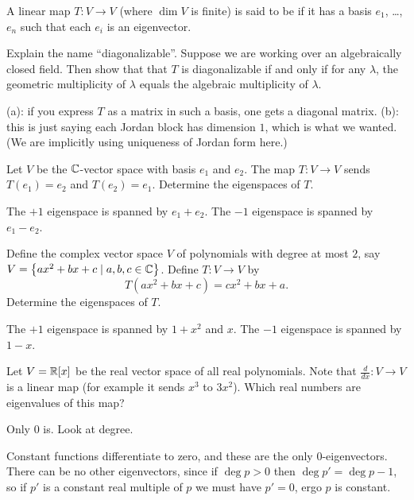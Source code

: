 \begin{problem}
	A linear map $T \colon V \to V$ (where $\dim V$ is finite)
	is said to be 
	if it has a basis $e_1$, \dots, $e_n$
	such that each $e_i$ is an eigenvector.
	\begin{enumerate}[(a)]
		\ii Explain the name ``diagonalizable''.
		\ii Suppose we are working over an algebraically closed field.
		Then show that that $T$ is diagonalizable if and only if
		for any $\lambda$, the geometric multiplicity of $\lambda$
		equals the algebraic multiplicity of $\lambda$.
	\end{enumerate}
	\begin{sol}
		(a): if you express $T$ as a matrix in such a basis,
		one gets a diagonal matrix.
		(b): this is just saying each Jordan block has dimension $1$,
		which is what we wanted.
		(We are implicitly using uniqueness of Jordan form here.)
	\end{sol}
\end{problem}

\begin{problem}
	[Switcharoo]
	Let $V$ be the $\mathbb C$-vector space
	with basis $e_1$ and $e_2$.
	The map $T \colon V \to V$ sends $T(e_1) = e_2$ and $T(e_2) = e_1$.
	Determine the eigenspaces of $T$.
	\begin{sol}
		The $+1$ eigenspace is spanned by $e_1+e_2$.
		The $-1$ eigenspace is spanned by $e_1-e_2$.
	\end{sol}
\end{problem}

\begin{problem}
	Define the complex vector space $V$
	of polynomials with degree at most $2$,
	say $V = \left\{ ax^2 + bx + c \mid a,b,c \in \mathbb C \right\}$.
	Define $T \colon V \to V$ by
	\[ T(ax^2+bx+c) = cx^2+bx+a. \]
	Determine the eigenspaces of $T$.
	\begin{sol}
		The $+1$ eigenspace is spanned by $1+x^2$ and $x$.
		The $-1$ eigenspace is spanned by $1-x$.
	\end{sol}
\end{problem}

\begin{problem}
	Let $V = \mathbb R[x]$ be the real vector space of all real polynomials.
	Note that $\frac{d}{dx} \colon V \to V$ is a linear map
	(for example it sends $x^3$ to $3x^2$).
	Which real numbers are eigenvalues of this map?
	\begin{hint}
		Only $0$ is.
		Look at degree.
	\end{hint}
	\begin{sol}
		Constant functions differentiate to zero,
		and these are the only $0$-eigenvectors.
		There can be no other eigenvectors,
		since if $\deg p > 0$ then $\deg p' = \deg p - 1$,
		so if $p'$ is a constant real multiple of $p$
		we must have $p' = 0$, ergo $p$ is constant.
	\end{sol}
\end{problem}

